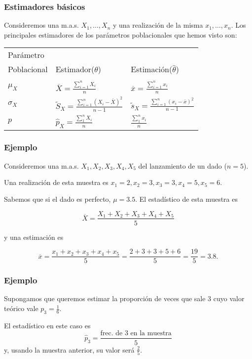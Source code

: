 \begin{frame} 
 \frametitle{Estimadores básicos}
Consideremos una m.a.s. $X_{1},\ldots,X_{n}$ y una realización de la misma
     $x_{1},\ldots,x_{n}$. Los principales estimadores de los
     parámetros poblacionales que hemos visto son:

     \begin{table}
\centering
     \begin{tabular}{l|ll}
     \hline
     Parámetro & & \\
    Poblacional & Estimador($\theta$) & Estimación($\hat{\theta}$)\\
    &  &  \\
     \hline
    $\mu_{X}$ & $\displaystyle \overline{X}=\frac{\sum_{i=1}^n X_{i}}{n}$ &  $\displaystyle\overline{x}=\frac{\sum_{i=1}^n x_{i}}{n}$ \\
    $\sigma_{X}$ & $\displaystyle\tilde{S}_{X}=\frac{\sum_{i=1}^n
    (X_{i}-\overline{X})^2}{n-1}$ &
    $\displaystyle\tilde{s}_{X}=\frac{\sum_{i=1}^n
    (x_{i}-\overline{x})^2}{n-1}$\\
    $p$ & $\displaystyle\hat{p}_{X}=\frac{\sum_{1}^n X_i}{n}$ & $\displaystyle\frac{\sum_{1}^n x_i}{n}$ \\
    \hline
    \end{tabular}
    \end{table}
\end{frame}

\begin{frame}
 \frametitle{Ejemplo} 
Consideremos una m.a.s.
     $X_{1},X_{2},X_{3},X_{4},X_{5}$ del lanzamiento de un dado ($n=5$).

     Una realización de esta muestra es
     $x_{1}=2,x_{2}=3,x_{3}=3,x_{4}=5,x_{5}=6$.


     Sabemos que si el dado es perfecto, $\mu=3.5$.
     El estadístico de esta muestra es


    $$\overline{X}=\frac{X_{1}+X_{2}+X_{3}+X_{4}+X_{5}}{5}$$

     y una estimación es

    $$\overline{x}=\frac{x_{1}+x_{2}+x_{3}+x_{4}+x_{5}}{5}=
     \frac{2+3+3+5+6}{5}=\frac{19}{5}=3.8.$$
\end{frame}

\begin{frame}
 \frametitle{Ejemplo} 
    Supongamos que queremos estimar  la proporción de veces que sale 3 cuyo valor teórico vale $p_{3}=
     \frac{1}{6}$.

     El estadístico en este caso es
     $$\hat{p}_{3}=\frac{\mbox{frec. de 3 en la muestra}}{5}$$
     y, usando la muestra anterior, su valor será $\frac{2}{5}$.

\end{frame}

